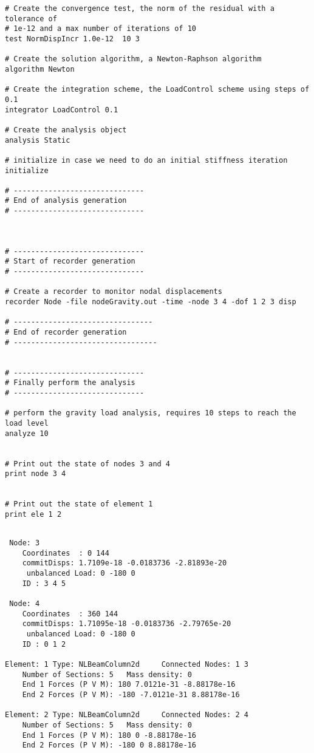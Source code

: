 \documentclass[12pt]{article}
\begin{document}
{\begin{verbatim}
# Create the convergence test, the norm of the residual with a tolerance of 
# 1e-12 and a max number of iterations of 10
test NormDispIncr 1.0e-12  10 3

# Create the solution algorithm, a Newton-Raphson algorithm
algorithm Newton

# Create the integration scheme, the LoadControl scheme using steps of 0.1 
integrator LoadControl 0.1

# Create the analysis object
analysis Static

# initialize in case we need to do an initial stiffness iteration
initialize

# ------------------------------
# End of analysis generation
# ------------------------------



# ------------------------------
# Start of recorder generation
# ------------------------------

# Create a recorder to monitor nodal displacements
recorder Node -file nodeGravity.out -time -node 3 4 -dof 1 2 3 disp

# --------------------------------
# End of recorder generation
# ---------------------------------


# ------------------------------
# Finally perform the analysis
# ------------------------------

# perform the gravity load analysis, requires 10 steps to reach the load level
analyze 10


# Print out the state of nodes 3 and 4
print node 3 4


# Print out the state of element 1
print ele 1 2
\end{verbatim}
}

\vspace{0.2in} 

{\sf\small
\begin{verbatim}

 Node: 3
	Coordinates  : 0 144 
	commitDisps: 1.7109e-18 -0.0183736 -2.81893e-20 
	 unbalanced Load: 0 -180 0 
	ID : 3 4 5 

 Node: 4
	Coordinates  : 360 144 
	commitDisps: 1.71095e-18 -0.0183736 -2.79765e-20 
	 unbalanced Load: 0 -180 0 
	ID : 0 1 2 

Element: 1 Type: NLBeamColumn2d 	Connected Nodes: 1 3 
	Number of Sections: 5	Mass density: 0
	End 1 Forces (P V M): 180 7.0121e-31 -8.88178e-16
	End 2 Forces (P V M): -180 -7.0121e-31 8.88178e-16

Element: 2 Type: NLBeamColumn2d 	Connected Nodes: 2 4 
	Number of Sections: 5	Mass density: 0
	End 1 Forces (P V M): 180 0 -8.88178e-16
	End 2 Forces (P V M): -180 0 8.88178e-16
\end{verbatim}
}
\end{document}
